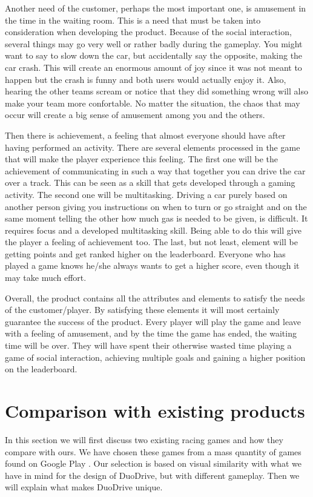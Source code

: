 \documentclass[11pt,twoside,a4paper]{article}
\begin{document}
Another need of the customer, perhaps the most important one, is amusement in the time in the waiting room. This is a need that must be taken into consideration when developing the product. Because of the social interaction, several things may go very well or rather badly during the gameplay. You might want to say to slow down the car, but accidentally say the opposite, making the car crash. This will create an enormous amount of joy since it was not meant to happen but the crash is funny and both users would actually enjoy it. Also, hearing the other teams scream or notice that they did something wrong will also make your team more confortable. No matter the situation, the chaos that may occur will create a big sense of amusement among you and the others.

Then there is achievement, a feeling that almost everyone should have after having performed an activity. There are several elements processed in the game that will make the player experience this feeling. The first one will be the achievement of communicating in such a way that together you can drive the car over a track. This can be seen as a skill that gets developed through a gaming activity. The second one will be multitasking. Driving a car purely based on another person giving you instructions on when to turn or go straight and on the same moment telling the other how much gas is needed to be given, is difficult. It requires focus and a developed multitasking skill. Being able to do this will give the player a feeling of achievement too. The last, but not least, element will be getting points and get ranked higher on the leaderboard. Everyone who has played a game knows he/she always wants to get a higher score, even though it may take much effort.

Overall, the product contains all the attributes and elements to satisfy the needs of the customer/player. By satisfying these elements it will most certainly guarantee the success of the product. Every player will play the game and leave with a feeling of amusement, and by the time the game has ended, the waiting time will be over. They will have spent their otherwise wasted time playing a game of social interaction, achieving multiple goals and gaining a higher position on the leaderboard.


\section{Comparison with existing products}
In this section we will first discuss two existing racing games and how they compare with ours. We have chosen these games from a mass quantity of games found on Google Play \cite{googleplay}. Our selection is based on visual similarity with what we have in mind for the design of DuoDrive, but with different gameplay. Then we will explain what makes DuoDrive unique.
\end{document}
